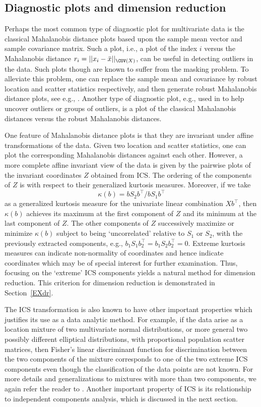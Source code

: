\documentclass[article,nojss]{jss}
\begin{document}
\subsection{Diagnostic plots and dimension reduction}\label{MADdr}

Perhaps the most common type of diagnostic plot for multivariate data is the classical Mahalanobis
distance plots based upon the sample mean vector and sample covariance matrix. Such a plot, i.e.,
a plot of the index $i$ versus the Mahalanobis distance $r_i = || x_i - \bar{x} ||_{\COV(X)}$,
can be useful in detecting outliers in the data.  Such plots though are known to suffer
from the masking problem. To alleviate this problem, one can replace the sample mean and covariance
by robust location and scatter statistics respectively, and then generate robust
Mahalanobis distance plots, see e.g., \citet{RousvanZom1990}. Another type of diagnostic plot,
e.g., used in \citet{RousvanDri1999} to help uncover outliers or groups of outliers, is a plot of the
classical Mahalanobis distances versus the robust Mahalanobis distances.

One feature of Mahalanobis distance plots is that they are invariant under affine transformations of
the data. Given two location and scatter statistics, one can plot the corresponding Mahalanobis
distances against each other. However, a more complete affine invariant view of the data is given
by the pairwise plots of the invariant coordinates $Z$ obtained from {ICS}. The ordering of
the components of $Z$ is with respect to their generalized kurtosis measures. Moreover, if we take
\[ \kappa(b) = bS_2b^\top/bS_1b^\top \]
as a generalized kurtosis measure for the univariate linear combination $Xb^\top$, then $\kappa(b)$
achieves its maximum at the first component of $Z$ and its minimum at the last component of $Z$.
The other components of $Z$ successively maximize or minimize $\kappa(b)$ subject to being `uncorrelated'
relative to $S_1$ or $S_2$, with the previously extracted components, e.g., $b_1S_1b_2^\top = b_1S_2b_2^\top = 0$.
Extreme kurtosis measures can indicate non-normality of coordinates and
hence indicate coordinates which may be of special interest for further examination. Thus, focusing on the
`extreme' {ICS} components yields a natural method for dimension reduction. This criterion for
dimension reduction is demonstrated in Section~\ref{EXdr}.

The {ICS} transformation is also known to have other important properties which justifies its use as
a data analytic method. For example, if the data arise as a location mixture of two multivariate normal
distributions, or more general two possibly different elliptical distributions, with proportional population
scatter matrices, then Fisher's linear discriminant function for discrimination between the two components
of the mixture corresponds to one of the two extreme {ICS} components even though the classification
of the data points are not known.  For more details and generalizations to mixtures with more than
two components, we again refer the reader to \citet{Tyler2008}. Another important property of {ICS}
is its relationship to independent components analysis, which is discussed in the next section.
\end{document}
